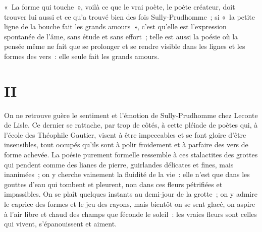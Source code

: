 \documentclass[french,twoside]{book} %
\begin{document}
\noindent « La forme qui touche », voilà ce que le vrai poète, le poète créateur, doit trouver lui aussi et ce qu’a trouvé bien des fois Sully-Prudhomme ; si « la petite ligne de la bouche fait les grands amours », c’est qu’elle est l’expression spontanée de l’âme, sans étude et sans effort ; telle est aussi la poésie où la pensée même ne fait que se prolonger et se rendre visible dans les lignes et les formes des vers : elle seule fait les grands amours.
\section[{II}]{II}
\noindent On ne retrouve guère le sentiment et l’émotion de Sully-Prudhomme chez Leconte de Lisle. Ce dernier se rattache, par trop de côtés, à cette pléiade de poètes qui, à l’école des Théophile Gautier, visent à être impeccables et se font gloire d’être insensibles, tout occupés qu’ils sont à polir froidement et à parfaire des vers de forme achevée. La poésie purement formelle ressemble à ces stalactites des grottes qui pendent comme des lianes de pierre, guirlandes délicates et fines, mais inanimées ; on y cherche vainement la fluidité de la vie : elle n’est que dans les gouttes d’eau qui tombent et pleurent, non dans ces fleurs pétrifiées et impassibles. On se plaît quelques instants au demi-jour de la grotte ; on y admire le caprice des formes et le jeu des rayons, mais bientôt on se sent glacé, on aspire à l’air libre et chaud des champs que féconde le soleil : les vraies fleurs sont celles qui vivent, s’épanouissent et aiment.\par
\end{document}
